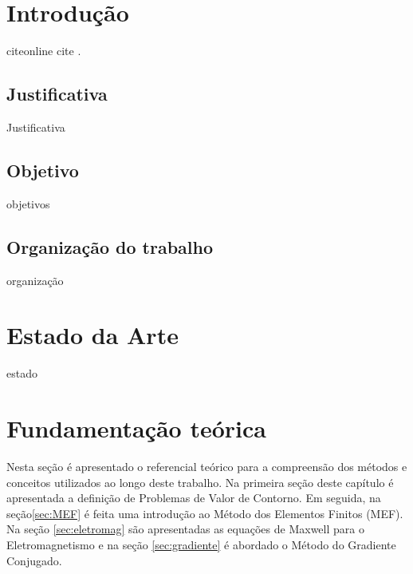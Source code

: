 \documentclass[
    12pt,               %
    openright,          %
    oneside,
    a4paper,            %
    english,            %
    french,             %
    spanish,            %
    brazil              %
    ]{abntex2}
\begin{document}
\tableofcontents*
\cleardoublepage


\textual

\chapter{Introdução}
citeonline   cite \cite{IEEECEC2016}.


\section{Justificativa}

Justificativa


\section{Objetivo}

objetivos


\section{Organização do trabalho}

organização


\chapter{Estado da Arte}
estado 

\chapter{Fundamentação teórica}
Nesta seção é apresentado o referencial teórico para a compreensão dos métodos e conceitos utilizados ao longo deste trabalho. Na primeira seção deste capítulo é apresentada a definição de Problemas de Valor de Contorno. Em seguida, na seção\ref{sec:MEF} é feita uma introdução ao Método dos Elementos Finitos (MEF). Na seção \ref{sec:eletromag} são apresentadas as equações de Maxwell para o Eletromagnetismo e na seção \ref{sec:gradiente} é abordado o Método do Gradiente Conjugado.
\end{document}
